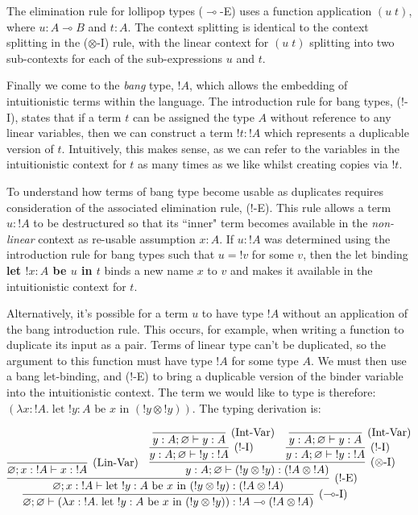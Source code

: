 \documentclass[]{unswthesis}
\let\emptyset\varnothing
\newcommand{\types}{\vdash}
\newcommand{\lolly}{\multimap}
\let\i\textit
\let\b\textbf
\let\t\text
\begin{document}
The elimination rule for lollipop types ($\lolly$-E) uses a function application $(u \; t)$, where $u : A \lolly B$ and $t : A$. The context splitting is identical to the context splitting in the ($\otimes$-I) rule, with the linear context for $(u \; t)$ splitting into two sub-contexts for each of the sub-expressions $u$ and $t$.

Finally we come to the \i{bang} type, $!A$, which allows the embedding of intuitionistic terms within the language. The introduction rule for bang types, (!-I), states that if a term $t$ can be assigned the type $A$ without reference to any linear variables, then we can construct a term ${!t} : {!A}$ which represents a duplicable version of $t$. Intuitively, this makes sense, as we can refer to the variables in the intuitionistic context for $t$ as many times as we like whilst creating copies via $!t$.

To understand how terms of bang type become usable as duplicates requires consideration of the associated elimination rule, (!-E). This rule allows a term $u : {!A}$ to be destructured so that its ``inner" term becomes available in the \i{non-linear} context as re-usable assumption $x : A$. If $u : {!A}$ was determined using the introduction rule for bang types such that $u = {!v}$ for some $v$, then the let binding \b{let $!x : A$ be $u$ in $t$} binds a new name $x$ to $v$ and makes it available in the intuitionistic context for $t$.

Alternatively, it's possible for a term $u$ to have type $!A$ without an application of the bang introduction rule. This occurs, for example, when writing a function to duplicate its input as a pair. Terms of linear type can't be duplicated, so the argument to this function must have type $!A$ for some type $A$. We must then use a bang let-binding, and (!-E) to bring a duplicable version of the binder variable into the intuitionistic context. The term we would like to type is therefore: $(\lambda x : {!A}. \; \t{let } {!y} : A \t{ be } x \t{ in } ({!y} \otimes {!y}))$. The typing derivation is:

\begin{eqnarray*}
\infer[\t{($\lolly$-I)}]{\emptyset; \emptyset \types (\lambda x : {!A}. \; \t{let } {!y} : A \t{ be } x \t{ in } ({!y} \otimes {!y})) : {!A} \lolly ({!A} \otimes {!A})}{
  \infer[\t{(!-E)}]{\emptyset; x : {!A} \types \t{let } {!y} : A \t{ be } x \t{ in } ({!y} \otimes {!y}) : ({!A} \otimes {!A})}{
    \infer[\t{(Lin-Var)}]{
      \emptyset; x : {!A} \types x : {!A}
    }{} &
    \infer[\t{($\otimes$-I)}]{
      y : A; \emptyset \types ({!y} \otimes {!y}) : ({!A} \otimes {!A})
    }{
      \infer[\t{(!-I)}]{y : A; \emptyset \types {!y} : {!A}}{
        \infer[\t{(Int-Var)}]{y : A; \emptyset \types y : A}{}
      } &
      \infer[\t{(!-I)}]{y : A; \emptyset \types {!y} : {!A}}{
        \infer[\t{(Int-Var)}]{y : A; \emptyset \types y : A}{}
      }
    }
  }
}
\end{eqnarray*}
\end{document}

